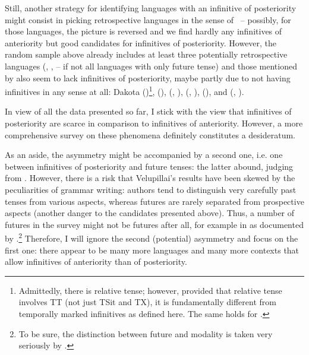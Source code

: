 \documentclass[output=paper,hidelinks]{langscibook}
\begin{document}
Still, another strategy for identifying languages with an infinitive of posteriority might consist in picking retrospective languages in the sense of \citet{Ultan1978}~– possibly, for those languages, the picture is reversed and we find hardly any infinitives of anteriority but good candidates for infinitives of posteriority. However, the random sample above already includes at least three potentially retrospective languages (, ,  – if not all languages with only future tense) and those mentioned by \citet{Ultan1978} also seem to lack infinitives of posteriority, maybe partly due to not having infinitives in any sense at all: Dakota (\citealt[105, 156]{BoasDeloria1976})\footnote{Admittedly, there is relative tense; however, provided that relative tense involves TT (not just TSit and TX), it is fundamentally different from temporally marked infinitives as defined here. The same holds for  \citep[23]{Churchward1940}.},  (\citealt{GregoresSuárez1967}),  (\citealt{Masayesva-Jeanne1978}, \citealt{HillBlack1998}),  (\citealt{Barrie2015}, \citealt{Woodbury2018}),  (\citealt{Churchward1940}), and  (\citealt[esp. p. 577]{Vincent1973}, \citealt{McKaughan1973}).

In view of all the data presented so far, I stick with the view that infinitives of posteriority are scarce in comparison to infinitives of anteriority. However, a more comprehensive survey on these phenomena definitely constitutes a desideratum.

As an aside, the asymmetry might be accompanied by a second one, i.e. one between infinitives of posteriority and future tenses: the latter abound, judging from \citet{Velupillai2016}. However, there is a risk that Velupillai’s results have been skewed by the peculiarities of grammar writing: authors tend to distinguish very carefully past tenses from various aspects, whereas futures are rarely separated from prospective aspects (another danger to the candidates presented above). Thus, a number of futures in the survey might not be futures after all, for example in  as documented by \citet{Böhm1984}.\footnote{To be sure, the distinction between future and modality is taken very seriously by \citet[101]{Velupillai2016}.} Therefore, I will ignore the second (potential) asymmetry and focus on the first one: there appear to be many more languages and many more contexts that allow infinitives of anteriority than of posteriority.
\end{document}

